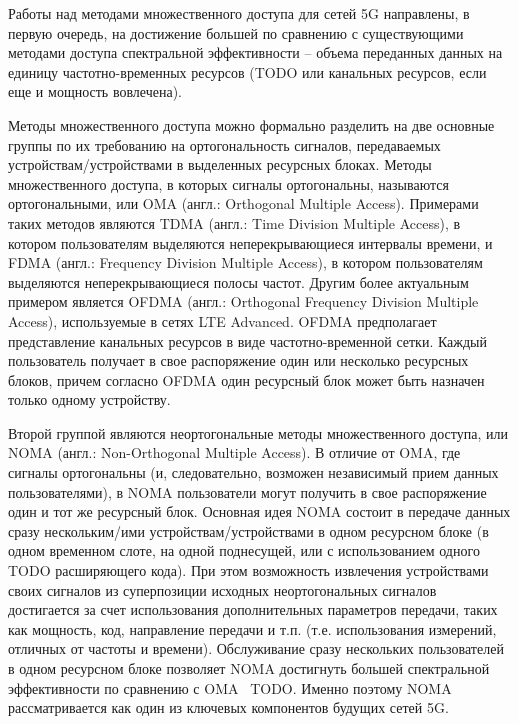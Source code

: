 \documentclass{book}
\numberwithin{theorem}{chapter}
\numberwithin{statement}{chapter}
\numberwithin{lemma}{chapter}
\theoremstyle{definition}
\numberwithin{task}{chapter}
\theoremstyle{remark}
\numberwithin{example}{chapter}
\theoremstyle{definition}
\numberwithin{definition}{chapter}
\theoremstyle{remark}
\theoremstyle{remark}
\numberwithin{lyrics}{section}
\begin{document}

Работы над методами множественного доступа для сетей 5G направлены, в первую очередь, на достижение большей по сравнению с существующими методами доступа спектральной эффективности -- объема переданных данных на единицу частотно-временных ресурсов (TODO или канальных ресурсов, если еще и мощность вовлечена).

Методы множественного доступа можно формально разделить на две основные группы по их требованию на ортогональность сигналов, передаваемых устройствам/устройствами в выделенных  ресурсных блоках. Методы множественного доступа, в которых сигналы ортогональны, называются ортогональными, или OMA (англ.: Orthogonal Multiple Access). Примерами таких методов являются TDMA (англ.: Time Division Multiple Access), в котором пользователям выделяются неперекрывающиеся интервалы времени, и FDMA (англ.: Frequency Division Multiple Access), в котором пользователям выделяются неперекрывающиеся полосы частот. Другим более актуальным примером является OFDMA (англ.: Orthogonal Frequency Division Multiple Access), используемые в сетях LTE Advanced. OFDMA предполагает представление канальных ресурсов в виде частотно-временной сетки. Каждый пользователь получает в свое распоряжение один или несколько ресурсных блоков, причем согласно OFDMA один ресурсный блок может быть назначен только одному устройству.

Второй группой являются неортогональные методы множественного доступа, или NOMA (англ.: Non-Orthogonal Multiple Access). В отличие от OMA, где сигналы ортогональны (и, следовательно, возможен независимый прием данных пользователями), в NOMA пользователи могут получить в свое распоряжение один и тот же ресурсный блок. 
Основная идея NOMA состоит в передаче данных сразу нескольким/ими устройствам/устройствами в одном ресурсном блоке (в одном временном слоте, на одной поднесущей, или с использованием одного TODO расширяющего кода).
При этом возможность извлечения устройствами своих сигналов из суперпозиции исходных неортогональных сигналов достигается за счет использования дополнительных параметров передачи, таких как мощность, код, направление передачи и т.п. (т.е. использования измерений, отличных от частоты и времени).
Обслуживание сразу нескольких пользователей в одном ресурсном блоке позволяет NOMA достигнуть большей спектральной эффективности по сравнению с OMA~\cite{} TODO. Именно поэтому NOMA рассматривается как один из ключевых компонентов будущих сетей 5G. 
\end{document}
